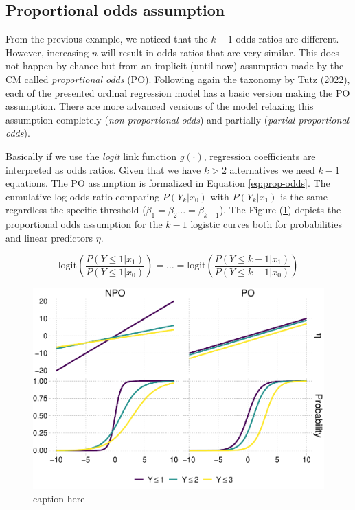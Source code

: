 \documentclass[
  man,floatsintext]{apa6}
\begin{document}
\normalsize

\subsection{Proportional odds assumption}\label{proportional-odds-assumption}

From the previous example, we noticed that the \(k - 1\) odds ratios are different. However, increasing \(n\) will result in odds ratios that are very similar. This does not happen by chance but from an implicit (until now) assumption made by the CM called \emph{proportional odds} (PO). Following again the taxonomy by Tutz (2022), each of the presented ordinal regression model has a basic version making the PO assumption. There are more advanced versions of the model relaxing this assumption completely (\emph{non proportional odds}) and partially (\emph{partial proportional odds}).

Basically if we use the \emph{logit} link function \(g(\cdot)\), regression coefficients are interpreted as odds ratios. Given that we have \(k > 2\) alternatives we need \(k - 1\) equations. The PO assumption is formalized in Equation \eqref{eq:prop-odds}. The cumulative log odds ratio comparing \(P(Y_k|x_0)\) with \(P(Y_k|x_1)\) is the same regardless the specific threshold (\(\beta_1 = \beta_2 \dots = \beta_{k - 1}\)). The Figure (\ref{fig:fig-prop-odds}) depicts the proportional odds assumption for the \(k - 1\) logistic curves both for probabilities and linear predictors \(\eta\).

\begin{equation}
\text{logit} (\frac{P(Y \leq 1 |x_1)}{P(Y \leq 1 |x_0)}) = \dots = \text{logit} (\frac{P(Y \leq k - 1 |x_1)}{P(Y \leq k -1 |x_0)})
\label{eq:prop-odds}
\end{equation}

\scriptsize

\begin{figure}

{\centering \includegraphics{paper_files/figure-latex/fig-prop-odds-1} 

}

\caption{caption here}\label{fig:fig-prop-odds}
\end{figure}
\end{document}
